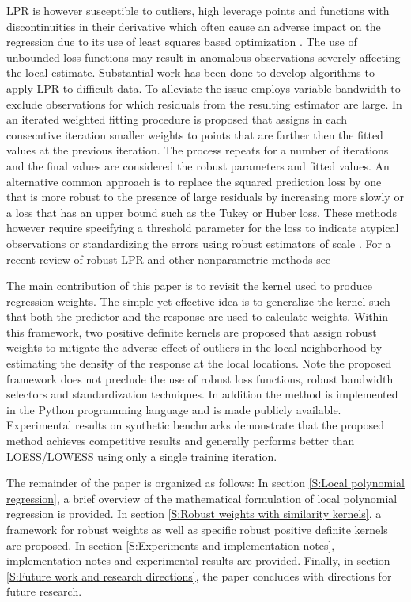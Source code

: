 \documentclass[preprint,1p,times]{elsarticle}
\begin{document}
LPR is however susceptible to outliers, high leverage points and functions with discontinuities in their derivative which often cause an adverse impact on the regression due to its use of least squares based optimization \citep{10.1002/wics.1492}. The use of unbounded loss functions may result in anomalous observations severely affecting the local estimate. Substantial work has been done to develop algorithms to apply LPR to difficult data. To alleviate the issue \citep{10.1214/aos/1024691246} employs variable bandwidth to exclude observations for which residuals from the resulting estimator are large. In \citep{clevland79} an iterated weighted fitting procedure is proposed that assigns in each consecutive iteration smaller weights to points that are farther then the fitted values at the previous iteration. The process repeats for a number of iterations and the final values are considered the robust parameters and fitted values. An alternative common approach is to replace the squared prediction loss by one that is more robust to the presence of large residuals by increasing more slowly or a loss that has an upper bound such as the Tukey or Huber loss. These methods however require specifying a threshold parameter for the loss to indicate atypical observations or standardizing the errors using robust estimators of scale \citep{Maronna2006RobustST}. For a recent review of robust LPR and other nonparametric methods see \citep{10.1002/wics.1492, SALIBIANBARRERA2023}

The main contribution of this paper is to revisit the kernel used to produce regression weights. The simple yet effective idea is to generalize the kernel such that both the predictor and the response are used to calculate weights. Within this framework, two positive definite kernels are proposed that assign robust weights to mitigate the adverse effect of outliers in the local neighborhood by estimating the density of the response at the local locations. Note the proposed framework does not preclude the use of robust loss functions, robust bandwidth selectors and standardization techniques. In addition the method is implemented in the Python programming language and is made publicly available. Experimental results on synthetic benchmarks demonstrate that the proposed method achieves competitive results and generally performs better than LOESS/LOWESS using only a single training iteration.

The remainder of the paper is organized as follows: In section \ref{S:Local polynomial regression}, a brief overview of the mathematical formulation of local polynomial regression is provided. In section \ref{S:Robust weights with similarity kernels}, a framework for robust weights as well as specific robust positive definite kernels are proposed. In section \ref{S:Experiments and implementation notes}, implementation notes and experimental results are provided. Finally, in section \ref{S:Future work and research directions}, the paper concludes with directions for future research.
\end{document}
